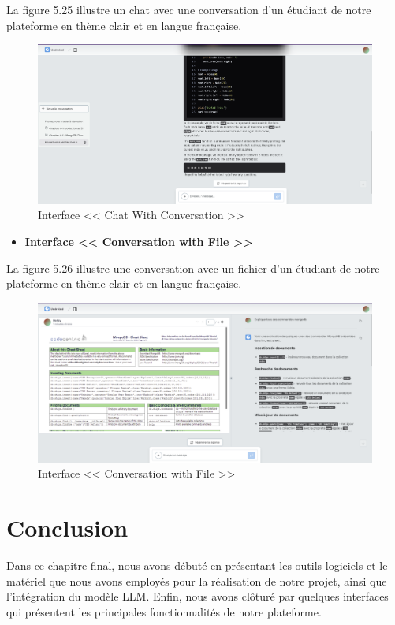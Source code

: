 La figure 5.25 illustre un chat avec une conversation d'un étudiant de notre plateforme en thème clair et en langue française.
\begin{figure}[H]
    \centering
    \includegraphics[width=1.1\textwidth,height=0.5\textwidth]{images/chp5/fig25.png}
    \caption{Interface << Chat With Conversation >>}
    \label{Interface << Chat With Conversation >>}    
\end{figure}
\begin{itemize}
    \item \textbf{Interface << Conversation with File >>}
\end{itemize}
La figure 5.26 illustre une conversation avec un fichier d'un étudiant de notre plateforme en thème clair et en langue française.
\begin{figure}[H]
    \centering
    \includegraphics[width=1.1\textwidth,height=0.5\textwidth]{images/chp5/fig26.png}
    \caption{Interface << Conversation with File >>}
    \label{Interface << Conversation with File >>}    
\end{figure}
\section*{Conclusion}
Dans ce chapitre final, nous avons débuté en présentant les outils logiciels et le matériel que nous avons employés pour la réalisation de notre projet, ainsi que l'intégration du modèle LLM. Enfin, nous avons clôturé par quelques interfaces qui présentent les principales fonctionnalités de notre plateforme.

